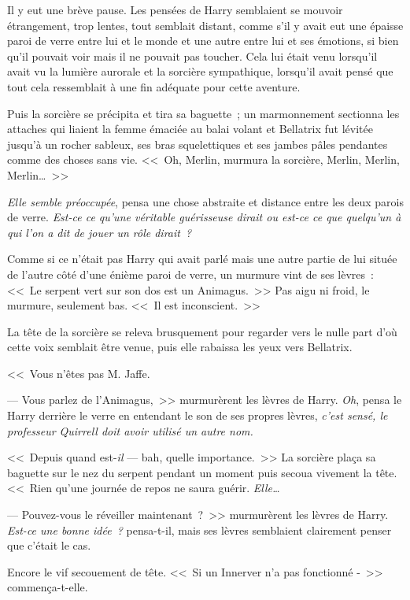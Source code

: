 Il y eut une brève pause. Les pensées de Harry semblaient se mouvoir étrangement, trop lentes, tout semblait distant, comme s'il y avait eut une épaisse paroi de verre entre lui et le monde et une autre entre lui et ses émotions, si bien qu'il pouvait voir mais il ne pouvait pas toucher. Cela lui était venu lorsqu'il avait vu la lumière aurorale et la sorcière sympathique, lorsqu'il avait pensé que tout cela ressemblait à une fin adéquate pour cette aventure.

Puis la sorcière se précipita et tira sa baguette~; un marmonnement sectionna les attaches qui liaient la femme émaciée au balai volant et Bellatrix fut lévitée jusqu'à un rocher sableux, ses bras squelettiques et ses jambes pâles pendantes comme des choses sans vie. <<~Oh, Merlin, murmura la sorcière, Merlin, Merlin, Merlin…~>>

\emph{Elle semble préoccupée}, pensa une chose abstraite et distance entre les deux parois de verre. \emph{Est-ce ce qu'une véritable guérisseuse dirait ou est-ce ce que quelqu'un à qui l'on a dit de jouer un rôle dirait~?}

Comme si ce n'était pas Harry qui avait parlé mais une autre partie de lui située de l'autre côté d'une énième paroi de verre, un murmure vint de ses lèvres~: <<~Le serpent vert sur son dos est un Animagus.~>> Pas aigu ni froid, le murmure, seulement bas. <<~Il est inconscient.~>>

La tête de la sorcière se releva brusquement pour regarder vers le nulle part d'où cette voix semblait être venue, puis elle rabaissa les yeux vers Bellatrix.

<<~Vous n'êtes pas M. Jaffe.

--- Vous parlez de l'Animagus,~>> murmurèrent les lèvres de Harry. \emph{Oh}, pensa le Harry derrière le verre en entendant le son de ses propres lèvres, \emph{c'est sensé, le professeur Quirrell doit avoir utilisé un autre nom.}

<<~Depuis quand est-\emph{il} — bah, quelle importance.~>> La sorcière plaça sa baguette sur le nez du serpent pendant un moment puis secoua vivement la tête. <<~Rien qu'une journée de repos ne saura guérir. \emph{Elle…}

--- Pouvez-vous le réveiller maintenant~?~>> murmurèrent les lèvres de Harry. \emph{Est-ce une bonne idée~?} pensa-t-il, mais ses lèvres semblaient clairement penser que c'était le cas.

Encore le vif secouement de tête. <<~Si un Innerver n'a pas fonctionné -~>> commença-t-elle.

